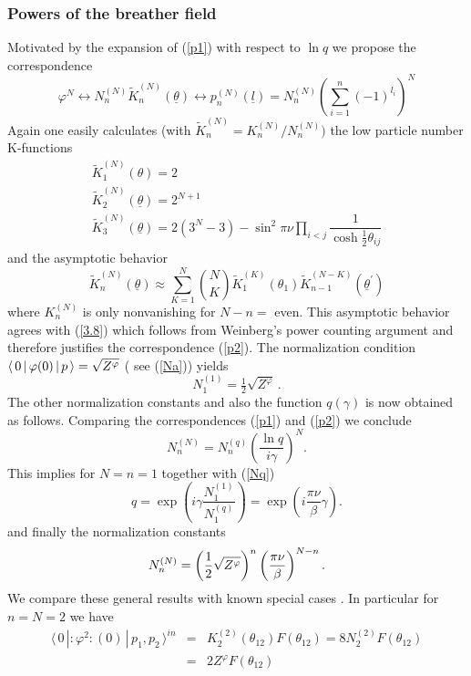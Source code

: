 \documentclass[a4paper,a4paper]{article}
\begin{document}
\subsubsection{Powers of the breather field}

Motivated by the expansion of (\ref{p1}) with respect to $\ln q$ we propose
the correspondence 
\begin{equation}
\varphi ^{N}\leftrightarrow N_{n}^{(N)}\tilde{K}_{n}^{(N)}(\underline{\theta 
})\leftrightarrow p_{n}^{(N)}(\underline{l})=N_{n}^{(N)}\left(
\sum\limits_{i=1}^{n}(-1)^{l_{i}}\right) ^{N}  \label{p2}
\end{equation}
Again one easily calculates (with $\tilde{K}%
_{n}^{(N)}=K_{n}^{(N)}/N_{n}^{(N)})$ the low particle number K-functions 
\[
\begin{array}{l}
\tilde{K}_{1}^{(N)}(\theta )=2 \\ 
\tilde{K}_{2}^{(N)}(\underline{\theta })=2^{N+1} \\ 
\tilde{K}_{3}^{(N)}(\underline{\theta })=2(3^{N}-3)-{\sin ^{2}\pi \nu }%
\prod\limits_{i<j}\dfrac{1}{\cosh \frac{1}{2}\theta _{ij}}
\end{array}
\]
and the asymptotic behavior 
\[
\tilde{K}_{n}^{(N)}(\underline{\theta })\approx \sum_{K=1}^{N}\binom{N}{K}%
\tilde{K}_{1}^{(K)}(\theta _{1})\tilde{K}_{n-1}^{(N-K)}(\underline{\theta }%
^{\prime }) 
\]
where $K_{n}^{(N)}$ is only nonvanishing for $N-n=$ even. This asymptotic
behavior agrees with (\ref{3.8}) which follows from Weinberg's power
counting argument and therefore justifies the correspondence (\ref{p2}). The
normalization condition $\langle \,0\,|\,\varphi (0)\,|\,p\,\rangle =\sqrt{%
Z^{\varphi }}$ ( see (\ref{Na})) yields 
\[
N_{1}^{(1)}=\tfrac{1}{2}\sqrt{Z^{\varphi }}\,. 
\]
The other normalization constants and also the function $q(\gamma )$ is now
obtained as follows. Comparing the correspondences (\ref{p1}) and (\ref{p2})
we conclude 
\[
N_{n}^{(N)}=N_{n}^{(q)}\left( \frac{\ln q}{i\gamma }\right) ^{N}. 
\]
This implies for $N=n=1$ together with (\ref{Nq}) 
\[
q=\exp \left( i\gamma \frac{N_{1}^{(1)}}{N_{1}^{(q)}}\right) =\exp \left( i%
\frac{\pi \nu }{\beta }\gamma \right) . 
\]
and finally the normalization constants 
\begin{equation}
N_{n}^{(N)}=\left( \frac{1}{2}\sqrt{Z^{\varphi }}\right) ^{n}\left( \frac{%
\pi \nu }{\beta }\right) ^{N-n}.  \label{4.2}
\end{equation}
We compare these general results with known special cases \cite{KW}. In
particular for $n=N=2$ we have 
\begin{eqnarray*}
\langle \,0\,|\!:\!\varphi ^{2}\!:\!(0)\,|\,p_{1},p_{2}\,\rangle ^{in}
&=&K_{2}^{(2)}(\theta _{12})F(\theta _{12})=8N_{2}^{(2)}F(\theta _{12}) \\
&=&2Z^{\varphi }F(\theta _{12})
\end{eqnarray*}
\end{document}
